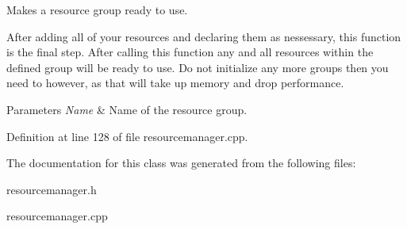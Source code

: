 Makes a resource group ready to use. 

After adding all of your resources and declaring them as nessessary, this function is the final step. After calling this function any and all resources within the defined group will be ready to use. Do not initialize any more groups then you need to however, as that will take up memory and drop performance. 
\begin{DoxyParams}{Parameters}
{\em Name} & Name of the resource group. \\
\hline
\end{DoxyParams}


Definition at line 128 of file resourcemanager.cpp.



The documentation for this class was generated from the following files:\begin{DoxyCompactItemize}
\item 
resourcemanager.h\item 
resourcemanager.cpp\end{DoxyCompactItemize}
